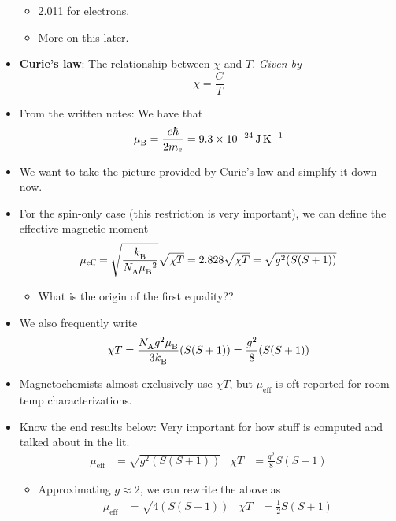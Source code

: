 \documentclass[../notes.tex]{subfiles}
\begin{document}
\begin{itemize}
\begin{itemize}
        \item 2.011 for electrons.
        \item More on this later.
    \end{itemize}
    \item \textbf{Curie's law}: The relationship between $\chi$ and $T$. \emph{Given by}
    \begin{equation*}
        \chi = \frac{C}{T}
    \end{equation*}
    \item From the written notes: We have that
    \begin{equation*}
        {\mu_\text{B}^{}} = \frac{e\hbar}{2m_e} = \SI{9.3e-24}{\joule\per\kelvin}
    \end{equation*}
    \item We want to take the picture provided by Curie's law and simplify it down now.
    \item For the spin-only case (this restriction is very important), we can define the effective magnetic moment
    \begin{equation*}
        \mu_\text{eff} = \sqrt{\frac{{k_\text{B}^{}}}{{N_\text{A}^{}}{\mu_\text{B}^{}}^2}}\sqrt{\chi T}
        = 2.828\sqrt{\chi T}
        = \sqrt{g^2(S(S+1))}
    \end{equation*}
    \begin{itemize}
        \item What is the origin of the first equality??
    \end{itemize}
    \item We also frequently write
    \begin{equation*}
        \chi T = \frac{{N_\text{A}^{}} g^2{\mu_\text{B}^{}}}{3{k_\text{B}^{}}}(S(S+1))
        = \frac{g^2}{8}(S(S+1))
    \end{equation*}
    \item Magnetochemists almost exclusively use $\chi T$, but $\mu_\text{eff}$ is oft reported for room temp characterizations.
    \item Know the end results below: Very important for how stuff is computed and talked about in the lit.
    \begin{align*}
        \mu_\text{eff} &= \sqrt{g^2(S(S+1))}&
        \chi T &= \frac{g^2}{8}S(S+1)
    \end{align*}
    \begin{itemize}
        \item Approximating $g\approx 2$, we can rewrite the above as
        \begin{align*}
            \mu_\text{eff} &= \sqrt{4(S(S+1))}&
            \chi T &= \frac{1}{2}S(S+1)

\end{align*}
\end{itemize}
\end{itemize}
\end{document}
